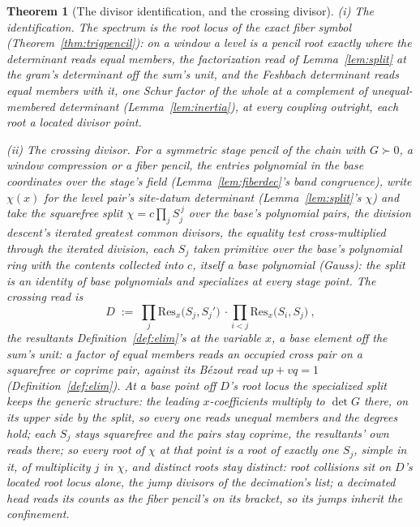 \documentclass[11pt]{article}
\newtheorem{theorem}{Theorem}
\theoremstyle{definition}
\begin{document}
\begin{theorem}[The divisor identification, and the crossing divisor]
\label{thm:divisorid}
\emph{(i) The identification.} The spectrum is the root locus of
the exact fiber symbol (Theorem~\ref{thm:trigpencil}): on a window a
level is a pencil root exactly where the determinant reads equal
members, the
factorization read of Lemma~\ref{lem:split} at the gram's
determinant off the sum's unit, and the Feshbach
determinant reads equal members with it, one Schur factor of the whole
at a complement of unequal-membered determinant
(Lemma~\ref{lem:inertia}), at every coupling
outright, each root a located divisor point.

\emph{(ii) The crossing divisor.} For a symmetric stage pencil of the
chain with $G\succ0$, a window compression or a fiber pencil, the
entries polynomial in the base coordinates over the stage's field
(Lemma~\ref{lem:fiberdec}'s band congruence), write $\chi(x)$ for the level
pair's site-datum determinant (Lemma~\ref{lem:split}'s $\chi$) and
take the squarefree split $\chi=c\prod_jS_j^{\,j}$ over the base's
polynomial pairs, the division descent's iterated greatest common
divisors, the equality test cross-multiplied
through the iterated division, each $S_j$ taken
primitive over the base's polynomial ring with the contents collected
into $c$, itself a base polynomial (Gauss): the split is an identity
of base polynomials and specializes at every stage point. The
\emph{crossing read} is
\[
D\;:=\;\prod_j\mathrm{Res}_x\big(S_j,S_j'\big)\ \cdot
\prod_{i<j}\mathrm{Res}_x\big(S_i,S_j\big)\ ,
\]
the resultants Definition~\ref{def:elim}'s at the variable $x$, a
base element off the sum's unit: a factor of equal members reads an
occupied cross pair on
a squarefree or coprime pair, against its B\'ezout read $up+vq=1$
(Definition~\ref{def:elim}). At
a base point off $D$'s root locus the specialized split keeps the generic
structure: the leading $x$-coefficients multiply to $\det G$ there, on its upper
side by the split, so every one reads unequal members and the degrees
hold; each $S_j$ stays squarefree and the pairs stay coprime, the
resultants' own reads there; so every root of $\chi$ at that point is
a root of exactly one $S_j$, simple in it, of multiplicity $j$ in
$\chi$, and distinct roots stay distinct: \emph{root collisions sit on
$D$'s located root locus alone}, the jump divisors of the
decimation's list; a decimated head reads its counts as the fiber
pencil's on its bracket, so its jumps inherit the confinement.


\end{theorem}
\end{document}
